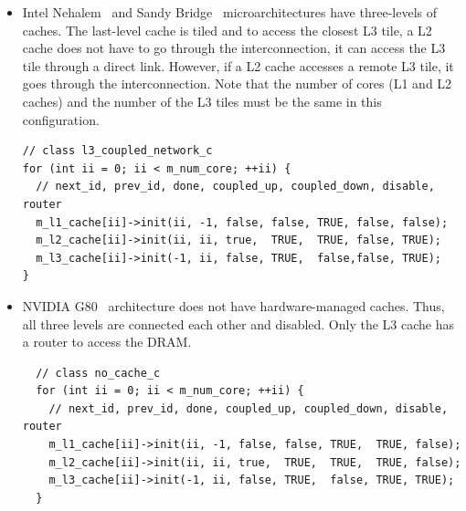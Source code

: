 \begin{itemize}

  \item Intel Nehalem~\cite{nehalem} and Sandy Bridge~\cite{sandybridge}
  microarchitectures have three-levels of caches. The last-level cache is tiled
  and to access the closest L3 tile, a L2 cache does not have to go through the
  interconnection, it can access the L3 tile through a direct link. However, if
  a L2 cache accesses a remote L3 tile, it goes through the interconnection.
  Note that the number of cores (L1 and L2 caches) and the number of the L3
  tiles must be the same in this configuration. 

\begin{Verbatim}
// class l3_coupled_network_c
for (int ii = 0; ii < m_num_core; ++ii) {
  // next_id, prev_id, done, coupled_up, coupled_down, disable, router
  m_l1_cache[ii]->init(ii, -1, false, false, TRUE, false, false);
  m_l2_cache[ii]->init(ii, ii, true,  TRUE,  TRUE, false, TRUE);
  m_l3_cache[ii]->init(-1, ii, false, TRUE,  false,false, TRUE);
}
\end{Verbatim}

  \item NVIDIA G80~\cite{g80} architecture does not have
  hardware-managed caches. Thus, all three levels are connected each
  other and disabled. Only the L3 cache has a router to access the DRAM.

  \begin{Verbatim}
  // class no_cache_c
  for (int ii = 0; ii < m_num_core; ++ii) {
    // next_id, prev_id, done, coupled_up, coupled_down, disable, router
    m_l1_cache[ii]->init(ii, -1, false, false, TRUE,  TRUE, false);
    m_l2_cache[ii]->init(ii, ii, true,  TRUE,  TRUE,  TRUE, false);
    m_l3_cache[ii]->init(-1, ii, false, TRUE,  false, TRUE, TRUE);
  }
  \end{Verbatim}


\end{itemize}
